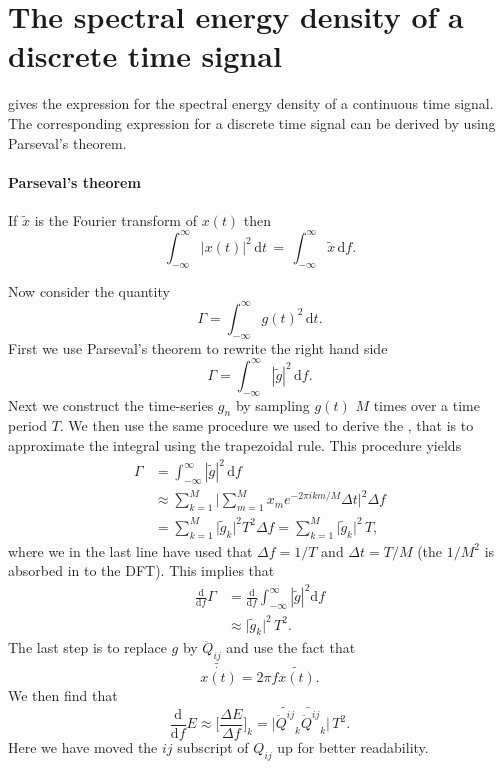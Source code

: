 \section{The spectral energy density of a discrete time signal}
 gives the expression for the spectral energy density of a continuous time signal.
The corresponding expression for a discrete time signal can be derived by using Parseval's theorem.
\begin{mdframed}[nobreak=true]
\paragraph{Parseval's theorem}
If $\widetilde{x}$ is the Fourier transform of $x(t)$ then
\begin{equation}
\int_{-\infty}^{\infty} |x(t)|^2 \, \mathrm{d} t \, = \, \int_{-\infty}^{\infty} \widetilde{x} \, \mathrm{d} f. 
\end{equation}  
\end{mdframed}

Now consider the quantity
\begin{equation}
\Gamma = \int_{-\infty}^{\infty} g(t)^2 \, \mathrm{d} t.  
\end{equation}
First we use Parseval's theorem to rewrite the right hand side
\begin{equation} \label{eqSA:start}
\Gamma = \int_{-\infty}^{\infty} |\widetilde{g}|^2 \, \mathrm{d} f.  
\end{equation}
Next we construct the time-series $g_n$ by sampling $g(t)$ $M$ times over a time period $T$.
We then use the same procedure we used to derive the , that is
to approximate the integral using the trapezoidal rule. This procedure yields
\begin{align} 
\Gamma &= \int_{-\infty}^{\infty} |\widetilde{g}|^2 \, \mathrm{d} f \nonumber \\ 
& \approx \sum_{k=1}^{M} \Big| \sum_{m=1}^{M} x_m e^{-2 \pi i k m/M} \Delta t \Big|^2 \Delta f \nonumber \\
& = \sum_{k=1}^{M} \big|\widetilde{g}_k \big|^2 T^2 \Delta f =  \sum_{k=1}^{M} \big|\widetilde{g}_k \big|^2 \, T,
\end{align}
where we in the last line have used that $\Delta f = 1/T$ and $\Delta t = T/M$ 
(the $1/M^2$ is absorbed in to the DFT). 
This implies that 
\begin{align}
\frac{\mathrm{d}}{\mathrm{d} f} \Gamma &= \frac{\mathrm{d}}{\mathrm{d} f} \int_{-\infty}^{\infty} |\widetilde{g}|^2 \mathrm{d} f \nonumber \\
&\approx \big|\widetilde{g}_k \big|^2 \, T^2.
\end{align}
The last step is to replace $g$ by $\dddot{Q}_{ij}$ and use the fact that
\begin{equation}
\widetilde{\dot{x(t)}} = 2\pi f \widetilde{x(t)}.  
\end{equation}
We then find that 
\begin{equation}
\frac{\mathrm{d}}{\mathrm{d} f} E \approx \Bigg[\frac{\Delta E}{\Delta f}\Bigg]_k = \big|\widetilde{\ddot{Q}^{ij}}_k \widetilde{\ddot{Q}^{ij}}_k| \, T^2.  
\end{equation}
Here we have moved the $ij$ subscript of $Q_{ij}$ up for better readability. 


